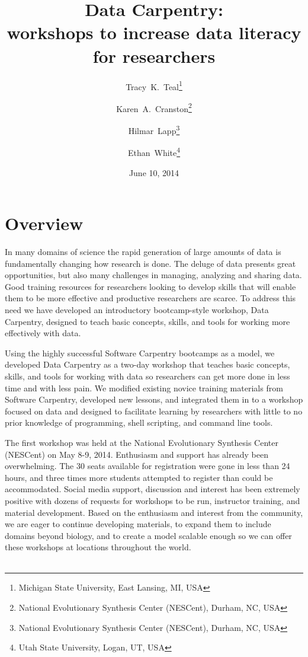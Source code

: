 \documentclass[11pt]{article}
\begin{document}
\title{Data Carpentry: \\workshops to increase data literacy for researchers\vspace{-1ex}}
\author{Tracy~K.~Teal\thanks{Michigan State University, East Lansing, MI, USA} \and Karen~A.~Cranston\thanks{National Evolutionary Synthesis Center (NESCent), Durham, NC, USA} \and Hilmar~Lapp\thanks{National Evolutionary Synthesis Center (NESCent), Durham, NC, USA} \and Ethan~White\thanks{Utah State University, Logan, UT, USA}\vspace{-2ex}}
\date{June 10, 2014\vspace{-2ex}}



\maketitle


\section{Overview }
In many domains of science the rapid generation of large
amounts of data is fundamentally changing how research is done. The deluge of data presents great
opportunities, but also many challenges in managing, analyzing and
sharing data. Good training resources for researchers looking to develop
skills that will enable them to be more effective and
productive researchers are scarce. To address this need we have
developed an introductory bootcamp-style workshop, Data Carpentry,
designed to teach basic concepts, skills, and tools for working more
effectively with data.

Using the highly successful Software Carpentry bootcamps as a model,
we developed Data Carpentry as a two-day workshop that teaches basic
concepts, skills, and tools for working with data so researchers can
get more done in less time and with less pain. We modified existing
novice training materials from Software Carpentry,
developed new lessons, and integrated them in to a workshop focused on 
data and designed to
facilitate learning by researchers with little to no prior knowledge of
programming, shell scripting, and command line tools.

The first workshop was held at the National Evolutionary Synthesis
Center (NESCent) on May 8-9, 2014. 
Enthusiasm and support has already been overwhelming. The 30 seats
available for registration were gone in less than 24 hours, and
three times more students attempted to register than could be accommodated. Social media
support, discussion and interest has been extremely positive with
dozens of requests for workshops to be run, instructor
training, and material development. Based on the enthusiasm and
interest from the community, we are eager to continue developing
materials, to expand them to include domains beyond biology, and to
create a model scalable enough so we can offer these workshops at
locations throughout the world.
\\ 
\\ 
\end{document}
